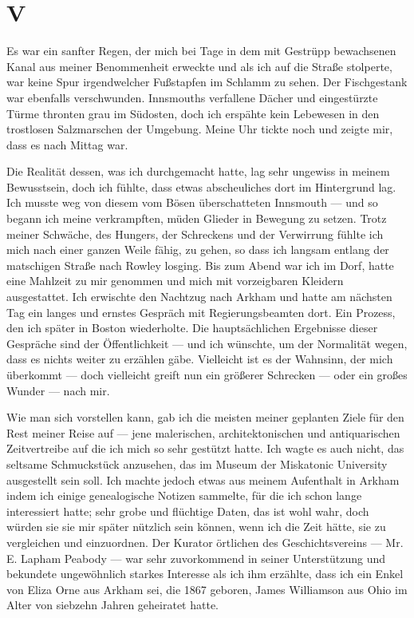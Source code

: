 \chapter*{V}

Es war ein sanfter Regen, der mich bei Tage in dem mit Gestrüpp bewachsenen Kanal aus meiner Benommenheit erweckte und als ich auf die Straße stolperte, war keine Spur irgendwelcher Fußstapfen im Schlamm zu sehen. Der Fischgestank war ebenfalls verschwunden. Innsmouths verfallene Dächer und eingestürzte Türme thronten grau im Südosten, doch ich erspähte kein Lebewesen in den trostlosen Salzmarschen der Umgebung. Meine Uhr tickte noch und zeigte mir, dass es nach Mittag war.

Die Realität dessen, was ich durchgemacht hatte, lag sehr ungewiss in meinem Bewusstsein, doch ich fühlte, dass etwas abscheuliches dort im Hintergrund lag. Ich musste weg von diesem vom Bösen überschatteten Innsmouth --- und so begann ich meine verkrampften, müden Glieder in Bewegung zu setzen. Trotz meiner Schwäche, des Hungers, der Schreckens und der Verwirrung fühlte ich mich nach einer ganzen Weile fähig, zu gehen, so dass ich langsam entlang der matschigen Straße nach Rowley losging. Bis zum Abend war ich im Dorf, hatte eine Mahlzeit zu mir genommen und mich mit vorzeigbaren Kleidern ausgestattet. Ich erwischte den Nachtzug nach Arkham und hatte am nächsten Tag ein langes und ernstes Gespräch mit Regierungsbeamten dort. Ein Prozess, den ich später in Boston wiederholte. Die hauptsächlichen Ergebnisse dieser Gespräche sind der Öffentlichkeit --- und ich wünschte, um der Normalität wegen, dass es nichts weiter zu erzählen gäbe. Vielleicht ist es der Wahnsinn, der mich überkommt --- doch vielleicht greift nun ein größerer Schrecken --- oder ein großes Wunder --- nach mir.

Wie man sich vorstellen kann, gab ich die meisten meiner geplanten Ziele für den Rest meiner Reise auf --- jene malerischen, architektonischen und antiquarischen Zeitvertreibe auf die ich mich so sehr gestützt hatte. Ich wagte es auch nicht, das seltsame Schmuckstück anzusehen, das im Museum der Miskatonic University ausgestellt sein soll. Ich machte jedoch etwas aus meinem Aufenthalt in Arkham indem ich einige genealogische Notizen sammelte, für die ich schon lange interessiert hatte; sehr grobe und flüchtige Daten, das ist wohl wahr, doch würden sie sie mir später nützlich sein können, wenn ich die Zeit hätte, sie zu vergleichen und einzuordnen. Der Kurator örtlichen des Geschichtsvereins --- Mr. E. Lapham Peabody --- war sehr zuvorkommend in seiner Unterstützung und bekundete ungewöhnlich starkes Interesse als ich ihm erzählte, dass ich ein Enkel von Eliza Orne aus Arkham sei, die 1867 geboren, James Williamson aus Ohio im Alter von siebzehn Jahren geheiratet hatte.

